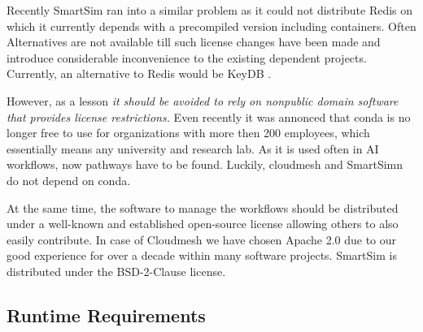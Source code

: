 \documentclass[utf8]{FrontiersinVancouver} %
\begin{document}
Recently SmartSim ran into a similar  problem as it could not distribute Redis on which it currently depends with a precompiled version including containers. Often Alternatives are not available till such license changes have been made and introduce considerable inconvenience to the existing dependent projects. Currently, an alternative to Redis would be KeyDB  \citep{keydb}. 

However, as a lesson {\em it should be avoided to rely on nonpublic domain software that provides license restrictions.} Even recently it was annonced that conda is no longer free to use for organizations with more then 200 employees, which essentially means any university and research lab. As it is used often in AI workflows, now pathways have to be found. Luckily, cloudmesh and SmartSimn do not depend on conda. 

At the same time, the software to manage the workflows should be distributed under a well-known and established open-source license allowing others to also easily contribute. In case of Cloudmesh we have chosen Apache 2.0 due to our good experience for over a decade within many software projects.
SmartSim is distributed under the BSD-2-Clause license.


\subsection{Runtime Requirements}
\end{document}
